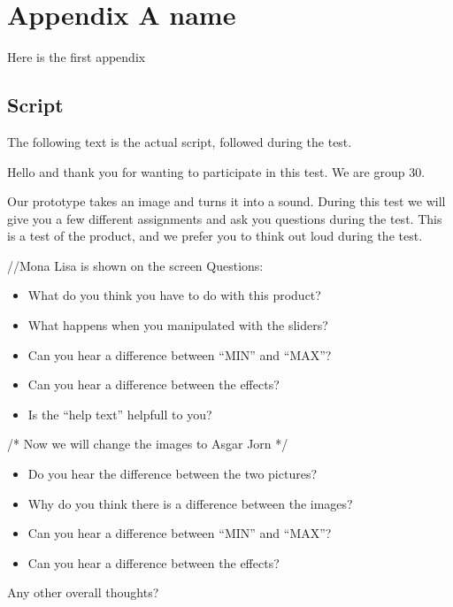 \chapter{Appendix A name}\label{ch:appAlabel}
Here is the first appendix

\section{Script}
The following text is the actual script, followed during the test.

Hello and thank you for wanting to participate in this test. We are group 30.

Our prototype takes an image and turns it into a sound. During this test we will give you a few different assignments and ask you questions during the test. This is a test of the product, and we prefer you to think out loud during the test.

//Mona Lisa is shown on the screen 
Questions: 


\begin{itemize}
\item What do you think you have to do with this product?
\item What happens when you manipulated with the sliders?
\item Can you hear a difference between “MIN” and “MAX”?
\item Can you hear a difference between the effects?
\item Is the “help text” helpfull to you?
\end{itemize}



/* Now we will change the images to Asgar Jorn */
\begin{itemize}
\item Do you hear the difference between the two pictures?
\item Why do you think there is a difference between the images?
\item Can you hear a difference between “MIN” and “MAX”?
\item Can you hear a difference between the effects?
\end{itemize}


Any other overall thoughts?